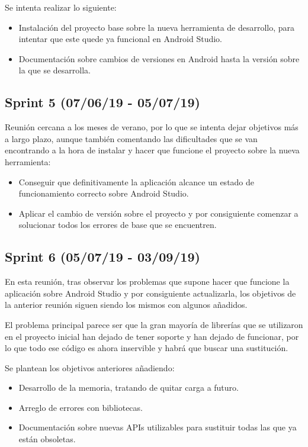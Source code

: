 Se intenta realizar lo siguiente:

\begin{itemize}
\item Instalación del proyecto base sobre la nueva herramienta de desarrollo, para intentar que este quede ya funcional en Android Studio.
\item Documentación sobre cambios de versiones en Android hasta la versión sobre la que se desarrolla.
\end{itemize}

\subsection{Sprint 5 (07/06/19 - 05/07/19)}

Reunión cercana a los meses de verano, por lo que se intenta dejar objetivos más a largo plazo, aunque también comentando las dificultades que se van encontrando a la hora de instalar y hacer que funcione el proyecto sobre la nueva herramienta:

\begin{itemize}
\item Conseguir que definitivamente la aplicación alcance un estado de funcionamiento correcto sobre Android Studio.
\item Aplicar el cambio de versión sobre el proyecto y por consiguiente comenzar a solucionar todos los errores de base que se encuentren.
\end{itemize}

\subsection{Sprint 6 (05/07/19 - 03/09/19)}

En esta reunión, tras observar los problemas que supone hacer que funcione la aplicación sobre Android Studio y por consiguiente actualizarla, los objetivos de la anterior reunión siguen siendo los mismos con algunos añadidos.

El problema principal parece ser que la gran mayoría de librerías que se utilizaron en el proyecto inicial han dejado de tener soporte y han dejado de funcionar, por lo que todo ese código es ahora inservible y habrá que buscar una sustitución.

Se plantean los objetivos anteriores añadiendo:

\begin{itemize}
\item Desarrollo de la memoria, tratando de quitar carga a futuro.
\item Arreglo de errores con bibliotecas.
\item Documentación sobre nuevas APIs utilizables para sustituir todas las que ya están obsoletas.
\end{itemize}

